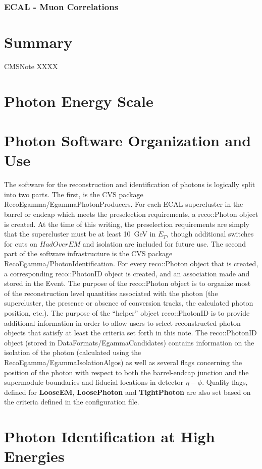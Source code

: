 \documentclass{cmspaper}
\begin{document}
\subsubsection{ECAL - Muon Correlations}


\section{Summary}

\begin{thebibliography}{9}
  CMSNote XXXX


\end{thebibliography}
 
\pagebreak
\appendix
\section{Photon Energy Scale}

\section{Photon Software Organization and Use}
The software for the reconstruction and identification of photons is logically
split into two parts.  The first, is the CVS package RecoEgamma/EgammaPhotonProducers.  For each ECAL 
supercluster in the barrel or endcap which meets the preselection requirements, a reco::Photon object 
is created.  At the time of this writing, the preselection requirements are simply that the 
supercluster must be at least 10~GeV in $E_T$, though additional switches for cuts on $HadOverEM$ 
and isolation are included for future use.  The second part of the software infrastructure is the
CVS package RecoEgamma/PhotonIdentification.  For every reco::Photon object that is created, a corresponding
reco::PhotonID object is created, and an association made and stored in the Event.
The purpose of the reco::Photon object is to organize most of the reconstruction level quantities associated
with the photon (the supercluster, the presence or absence of conversion tracks, the calculated photon 
position, etc.).  The purpose of the ``helper'' object reco::PhotonID is to provide additional information
in order to allow users to select reconstructed photon objects that satisfy at least the criteria set
forth in this note.  The reco::PhotonID object (stored in DataFormats/EgammaCandidates) contains information
on the isolation of the photon (calculated using the RecoEgamma/EgammaIsolationAlgos) as well as several
flags concerning the position of the photon with respect to both the barrel-endcap junction and the 
supermodule boundaries and fiducial locations in detector $\eta-\phi$.  Quality flags, defined for {\bf LooseEM}, {\bf LoosePhoton} and {\bf TightPhoton} are also set based on the criteria defined in the configuration file.

\section{Photon Identification at High Energies}
\end{document}
